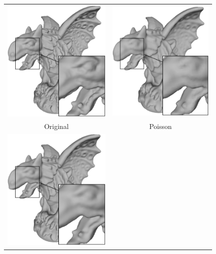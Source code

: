 \begin{figure} 
	\centering
	\begin{tabular}{c c}
		\includegraphics[width=0.48\linewidth,natwidth=750,natheight=750]{images/gargoyle/original.eps} &
		\includegraphics[width=0.48\linewidth,natwidth=750,natheight=750]{images/gargoyle/poisson.eps} \\
		Original & Poisson \\
		\includegraphics[width=0.48\linewidth,natwidth=750,natheight=750]{images/gargoyle/bcc.eps} &

\end{tabular}
\end{figure}
